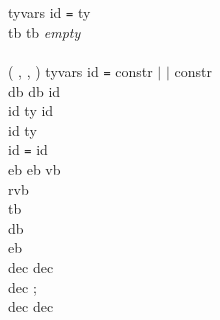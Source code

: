 {\begin{list}{}{\setlength{\listparindent}{0pt}
               \setlength{\labelwidth}{5em}
               \setlength{\labelsep}{0.5em}}
        tyvars id \verb"=" ty
\\              tb    tb
    {\it empty}
\\      
\\      (  ,  ,  )
        tyvars id \verb"=" constr $\mid$  $\mid$ constr
\\ db    db
    id
\\      id  ty
        id
\\      id  ty
\\      id \verb"=" id
\\       eb     eb
        vb
\\        rvb
\\       tb
\\       db
\\       eb
\\       dec  dec 
\\      dec ;
\\      dec dec

\end{list}
}
\onecolumn
